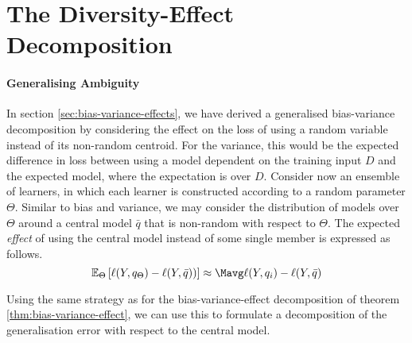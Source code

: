 \documentclass[../main.tex]{subfiles}
\begin{document}
\section{The Diversity-Effect Decomposition}
\label{sec:bias-variance-diversity-decomp}

\paragraph{Generalising Ambiguity} In section \ref{sec:bias-variance-effects}, we have derived a generalised bias-variance decomposition by considering the effect on the loss of using a random variable instead of its non-random centroid. 
For the variance, this would be the expected difference in loss between using a model dependent on the training input $D$ and the expected model, where the expectation is over $D$. 
Consider now an ensemble of learners, in which each learner is constructed according to a random parameter $\Theta$. Similar to bias and variance, we may consider the distribution of models over $\Theta$ around a central model $\bar{q}$ that is non-random with respect to $\Theta$. 
The expected \textit{effect} of using the central model instead of some single member is expressed as follows.
$$
\mathbb{E}_{\Theta}\left[   \ell(Y, q_{\Theta}) -  \ell(Y, \bar{q})) \right] \approx \Mavg \ell(Y, q_i) - \ell(Y, \bar{q})
$$


Using the same strategy as for the bias-variance-effect decomposition of theorem \ref{thm:bias-variance-effect}, we can use this to formulate a decomposition of the generalisation error with respect to the central model.


\end{document}
